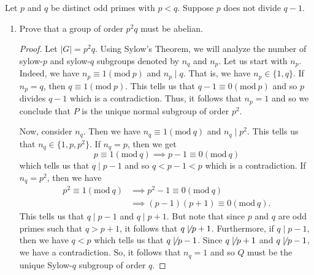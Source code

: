 \documentclass[a4paper]{article}
\begin{document}
\begin{problem}
    Let \( p  \) and \( q  \) be distinct odd primes with \( p < q  \). Suppose \( p  \) does not divide \( q - 1  \). 
    \begin{enumerate}
        \item[(a)] Prove that a group of order \( p^{2} q  \) must be abelian.
            \begin{proof}
                Let \( | G  |  = p^{2} q  \). Using Sylow's Theorem, we will analyze the number of sylow-\( p \)  and sylow-\( q \) subgroups  denoted by \( {n}_{q} \) and \( {n}_{p} \). Let us start with \( {n}_{p} \). Indeed, we have \( {n}_{p} \equiv 1 (\text{mod}  \ p) \) and \( {n}_{p} \mid q  \). That is, we have \( {n}_{p} \in \{ 1 , q  \}  \). If \( {n}_{p} = q  \), then \( q \equiv 1 (\text{mod} \ p) \). This tells us that \( q - 1 \equiv 0 (\text{mod} \  p)  \) and so \( p  \) divides \( q - 1  \) which is a contradiction. Thus, it follows that \( {n}_{p} = 1  \) and so we conclude that \( P  \) is the unique normal subgroup of order \( p^{2}  \).

                Now, consider \( {n}_{q} \). Then we have \( {n}_{q} \equiv 1 (\text{mod} \ q ) \) and \( {n}_{q} \mid p^{2} \). This tells us that \( {n}_{q} \in \{ 1, p , p^{2} \}  \). If \( {n}_{q} = p  \), then we get 
                \[  p \equiv 1 (\text{mod} \ q) \implies p - 1 \equiv 0 (\text{mod} \ q) \]
                which tells us that \( q \mid p - 1  \) and so \( q < p - 1 < p  \) which is a contradiction. If \( {n}_{q} = p^{2} \), then we have 
                \begin{align*}
                    p^{2} \equiv 1 (\text{mod} \ q) &\implies p^{2} - 1 \equiv 0 (\text{mod} \ q) \\
                                                    &\implies (p - 1)(p + 1) \equiv 0 (\text{mod} \ q ).
                \end{align*}
                This tells us that \( q \mid p - 1  \) and \( q \mid p + 1  \).
                But note that since \( p  \) and \( q  \) are odd primes such that \( q > p + 1  \), it follows that \( q \not\mid p + 1  \). Furthermore, if \( q \mid p - 1  \), then we have \( q < p  \) which tells us that \( q \not\mid p - 1  \). Since \( q \not\mid p + 1  \) and \( q \not\mid p - 1  \), we have a contradiction. So, it follows that \( {n}_{q} = 1  \) and so \( Q  \) must be the unique Sylow-\( q \) subgroup of order \( q  \). 


\end{proof}
\end{enumerate}
\end{problem}
\end{document}
